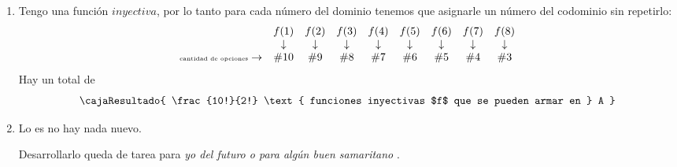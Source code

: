 \begin{enumerate}[label=\alph*)]
  \item Tengo una función $inyectiva$, por lo tanto para cada número del dominio tenemos que asignarle un número del codominio sin repetirlo:
        $$
          \begin{array}{lcccccccc}
                                                    & f(1)       & f(2)       & f(3)       & f(4)       & f(5)       & f(6)       & f(7)       & f(8)       \\
                                                    & \downarrow & \downarrow & \downarrow & \downarrow & \downarrow & \downarrow & \downarrow & \downarrow \\
            \text{{\tiny cantidad de opciones}} \to & \#10       & \#9        & \#8        & \#7        & \#6        & \#5        & \#4        & \#3        \\
          \end{array}
        $$
        Hay un total de
        $$
          \cajaResultado{
            \frac{10!}{2!} \text{ funciones inyectivas $f$ que se pueden armar en } A
          }
        $$

  \item Lo es no hay nada nuevo.

        Desarrollarlo queda de tarea para \textit{yo del futuro o para algún buen samaritano \grimace}.

        \hacer


\end{enumerate}
